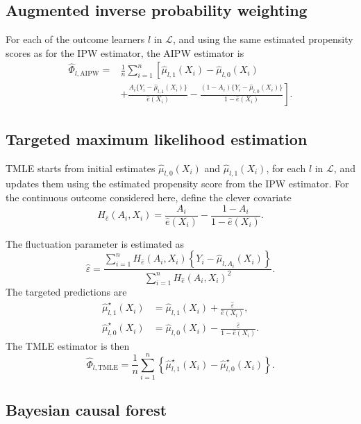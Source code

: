 \subsection{Augmented inverse probability weighting}

For each of the outcome learners \(l\) in \(\mathcal L\), and using the same estimated propensity scores as for the IPW estimator, the AIPW estimator \cite{bangDoublyRobustEstimation2005} is
\[
\begin{aligned}
\widehat{\Phi}_{l,\mathrm{AIPW}}
={}&
\frac{1}{n}
\sum_{i=1}^{n}
\left[
\widehat{\mu}_{l,1}(X_i)
-
\widehat{\mu}_{l,0}(X_i)
\right.\\
&\left.
+
\frac{
A_i\{Y_i-\widehat{\mu}_{l,1}(X_i)\}
}{
\widehat e(X_i)
}
-
\frac{
(1-A_i)\{Y_i-\widehat{\mu}_{l,0}(X_i)\}
}{
1-\widehat e(X_i)
}
\right].
\end{aligned}
\]

\subsection{Targeted maximum likelihood estimation}

TMLE \cite{vanderlaanTargetedMaximumLikelihood2006} starts from initial estimates \(\widehat{\mu}_{l,0}(X_i)\) and \(\widehat{\mu}_{l,1}(X_i)\), for each \(l\) in \(\mathcal L\), and updates them using the estimated propensity score from the IPW estimator. For the continuous outcome considered here, define the clever covariate
\[
H_{\widehat e}(A_i,X_i)
=
\frac{A_i}{\widehat e(X_i)}
-
\frac{1-A_i}{1-\widehat e(X_i)}.
\]

The fluctuation parameter is estimated as
\[
\widehat{\varepsilon}
=
\frac{
\sum_{i=1}^{n}
H_{\widehat e}(A_i,X_i)
\left\{
Y_i-\widehat{\mu}_{l,A_i}(X_i)
\right\}
}{
\sum_{i=1}^{n}
H_{\widehat e}(A_i,X_i)^2
}.
\]
The targeted predictions are
\[
\begin{aligned}
\widehat{\mu}^{\star}_{l,1}(X_i)
&=\widehat{\mu}_{l,1}(X_i)+\frac{\widehat{\varepsilon}}{\widehat e(X_i)},\\
\widehat{\mu}^{\star}_{l,0}(X_i)
&=\widehat{\mu}_{l,0}(X_i)-\frac{\widehat{\varepsilon}}{1-\widehat e(X_i)}.
\end{aligned}
\]
The TMLE estimator is then
\[
\widehat{\Phi}_{l,\mathrm{TMLE}}
=
\frac{1}{n}
\sum_{i=1}^{n}
\left\{
\widehat{\mu}^{\star}_{l,1}(X_i)
-
\widehat{\mu}^{\star}_{l,0}(X_i)
\right\}.
\]

\subsection{Bayesian causal forest}


